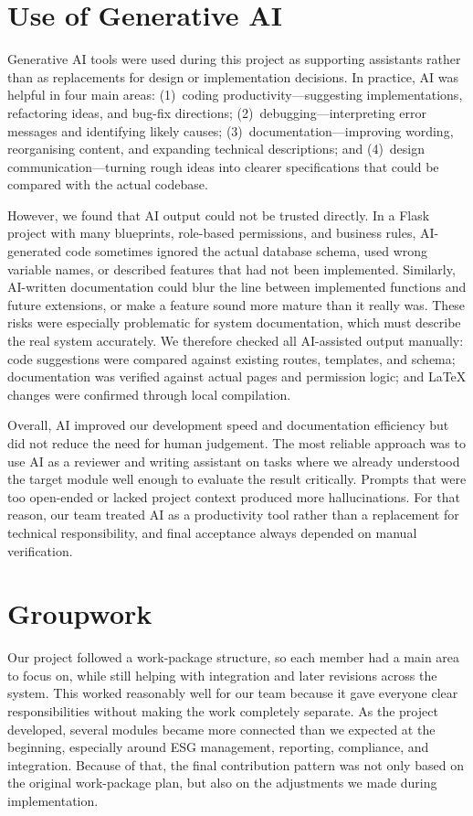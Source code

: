 \documentclass[11pt,a4paper]{article}
\begin{document}
\section{Use of Generative AI}
Generative AI tools were used during this project as supporting assistants rather than as replacements for design or implementation decisions. In practice, AI was helpful in four main areas: (1)~coding productivity---suggesting implementations, refactoring ideas, and bug-fix directions; (2)~debugging---interpreting error messages and identifying likely causes; (3)~documentation---improving wording, reorganising content, and expanding technical descriptions; and (4)~design communication---turning rough ideas into clearer specifications that could be compared with the actual codebase.

However, we found that AI output could not be trusted directly. In a Flask project with many blueprints, role-based permissions, and business rules, AI-generated code sometimes ignored the actual database schema, used wrong variable names, or described features that had not been implemented. Similarly, AI-written documentation could blur the line between implemented functions and future extensions, or make a feature sound more mature than it really was. These risks were especially problematic for system documentation, which must describe the real system accurately. We therefore checked all AI-assisted output manually: code suggestions were compared against existing routes, templates, and schema; documentation was verified against actual pages and permission logic; and LaTeX changes were confirmed through local compilation.

Overall, AI improved our development speed and documentation efficiency but did not reduce the need for human judgement. The most reliable approach was to use AI as a reviewer and writing assistant on tasks where we already understood the target module well enough to evaluate the result critically. Prompts that were too open-ended or lacked project context produced more hallucinations. For that reason, our team treated AI as a productivity tool rather than a replacement for technical responsibility, and final acceptance always depended on manual verification.

\section{Groupwork}
Our project followed a work-package structure, so each member had a main area to focus on, while still helping with integration and later revisions across the system. This worked reasonably well for our team because it gave everyone clear responsibilities without making the work completely separate. As the project developed, several modules became more connected than we expected at the beginning, especially around ESG management, reporting, compliance, and integration. Because of that, the final contribution pattern was not only based on the original work-package plan, but also on the adjustments we made during implementation.
\end{document}
